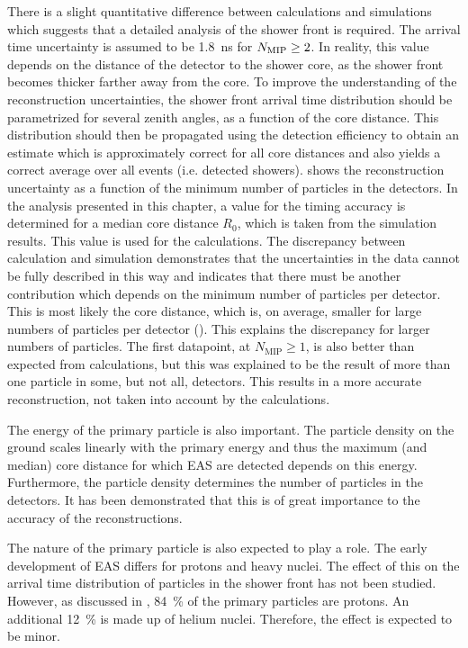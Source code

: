 There is a slight quantitative difference between calculations and simulations
which suggests that a detailed analysis of the shower front is required.  The
arrival time uncertainty is assumed to be \SI{1.8}{\nano\second} for
$N_\mathrm{\mip} \geq 2$.  In reality, this value depends on the distance of the
detector to the shower core, as the shower front becomes thicker farther away
from the core. To improve the understanding of the reconstruction uncertainties,
the shower front arrival time distribution should be parametrized for several
zenith angles, as a function of the core distance.
This distribution should then be propagated using the detection efficiency to
obtain an estimate which is approximately correct for all core distances and
also yields a correct average over all events (i.e. detected showers).
 shows the reconstruction uncertainty as a function
of the minimum number of particles in the detectors. In the analysis presented
in this chapter, a value for the timing accuracy is determined for a median core
distance $R_0$, which is taken from the simulation results. This value is used
for the calculations. The discrepancy between calculation and simulation
demonstrates that the uncertainties in the data cannot be fully described in
this way and indicates that there must be another contribution which depends on
the minimum number of particles per detector. This is most likely the core
distance, which is, on average, smaller for large numbers of particles per
detector (). This explains the discrepancy for larger
numbers of particles. The first datapoint, at $N_\mathrm{MIP} \geq 1$, is also
better than expected from calculations, but this was explained to be the result
of more than one particle in some, but not all, detectors. This results in a
more accurate reconstruction, not taken into account by the calculations.

The energy of the primary particle is also important. The particle density on
the ground scales linearly with the primary energy and thus the maximum (and
median) core distance for which EAS are detected depends on this energy.
Furthermore, the particle density determines the number of particles in the
detectors. It has been demonstrated that this is of great importance to the
accuracy of the reconstructions.

The nature of the primary particle is also expected to play a role. The early
development of EAS differs for protons and heavy nuclei. The effect of this on
the arrival time distribution of particles in the shower front has not been
studied. However, as discussed in ,
\SI{84}{\percent} of the primary particles are protons. An additional
\SI{12}{\percent} is made up of helium nuclei. Therefore, the effect is expected
to be minor.

